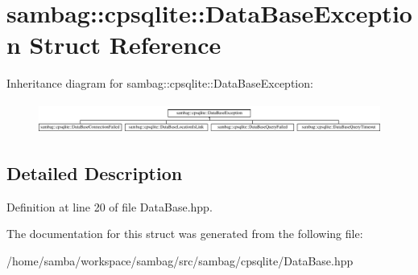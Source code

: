 \hypertarget{structsambag_1_1cpsqlite_1_1_data_base_exception}{
\section{sambag::cpsqlite::DataBaseException Struct Reference}
\label{structsambag_1_1cpsqlite_1_1_data_base_exception}
}
Inheritance diagram for sambag::cpsqlite::DataBaseException:\begin{figure}[H]
\begin{center}
\leavevmode
\includegraphics[height=1.037037cm]{structsambag_1_1cpsqlite_1_1_data_base_exception}
\end{center}
\end{figure}


\subsection{Detailed Description}


Definition at line 20 of file DataBase.hpp.



The documentation for this struct was generated from the following file:\begin{DoxyCompactItemize}
\item 
/home/samba/workspace/sambag/src/sambag/cpsqlite/DataBase.hpp\end{DoxyCompactItemize}
